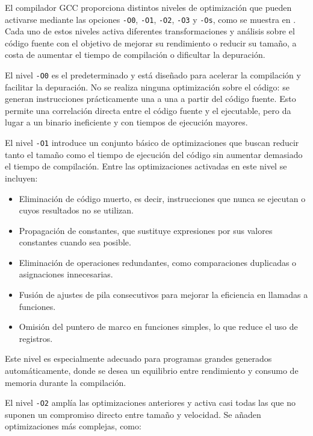 \documentclass[11pt,a4paper,twoside]{article}
\theoremstyle{definition}
\begin{document}
	El compilador GCC proporciona distintos niveles de optimización que pueden activarse mediante las opciones \texttt{-O0}, \texttt{-O1}, \texttt{-O2}, \texttt{-O3} y \texttt{-Os}, como se muestra en \cite{gcc}. Cada uno de estos niveles activa diferentes transformaciones y análisis sobre el código fuente con el objetivo de mejorar su rendimiento o reducir su tamaño, a costa de aumentar el tiempo de compilación o dificultar la depuración.
	
	El nivel \texttt{-O0} es el predeterminado y está diseñado para acelerar la compilación y facilitar la depuración. No se realiza ninguna optimización sobre el código: se generan instrucciones prácticamente una a una a partir del código fuente. Esto permite una correlación directa entre el código fuente y el ejecutable, pero da lugar a un binario ineficiente y con tiempos de ejecución mayores.
	
	El nivel \texttt{-O1} introduce un conjunto básico de optimizaciones que buscan reducir tanto el tamaño como el tiempo de ejecución del código sin aumentar demasiado el tiempo de compilación. Entre las optimizaciones activadas en este nivel se incluyen:
	
	\begin{itemize}
		\item Eliminación de código muerto, es decir, instrucciones que nunca se ejecutan o cuyos resultados no se utilizan.
		\item Propagación de constantes, que sustituye expresiones por sus valores constantes cuando sea posible.
		\item Eliminación de operaciones redundantes, como comparaciones duplicadas o asignaciones innecesarias.
		\item Fusión de ajustes de pila consecutivos para mejorar la eficiencia en llamadas a funciones.
		\item Omisión del puntero de marco en funciones simples, lo que reduce el uso de registros.
	\end{itemize}

	Este nivel es especialmente adecuado para programas grandes generados automáticamente, donde se desea un equilibrio entre rendimiento y consumo de memoria durante la compilación.
	
	El nivel \texttt{-O2} amplía las optimizaciones anteriores y activa casi todas las que no suponen un compromiso directo entre tamaño y velocidad. Se añaden optimizaciones más complejas, como:
	
\end{document}

